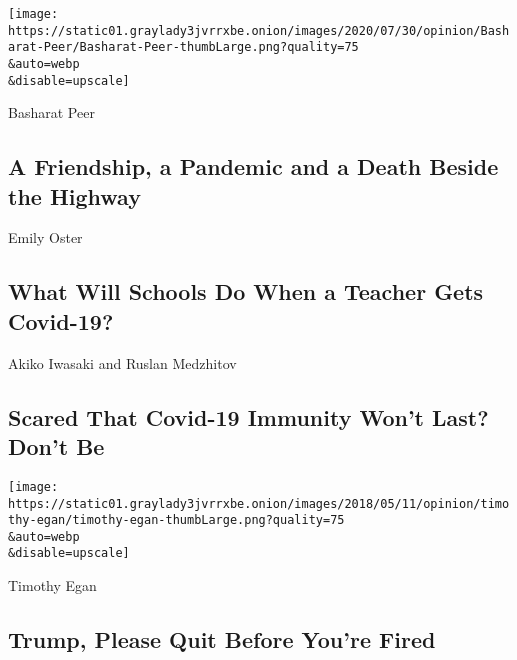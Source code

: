 \href{/2020/07/31/opinion/sunday/India-migration-coronavirus.html}{}

\texttt{[image: https://static01.graylady3jvrrxbe.onion/images/2020/07/30/opinion/Basharat-Peer/Basharat-Peer-thumbLarge.png?quality=75\\\&auto=webp\\\&disable=upscale]}

Basharat Peer

\hypertarget{a-friendship-a-pandemic-and-a-death-beside-the-highway}{%
\subsection{A Friendship, a Pandemic and a Death Beside the
Highway}\label{a-friendship-a-pandemic-and-a-death-beside-the-highway}}

\href{/2020/07/28/opinion/coronavirus-schools-reopening.html}{}

Emily Oster

\hypertarget{what-will-schools-do-when-a-teacher-gets-covid-19}{%
\subsection{What Will Schools Do When a Teacher Gets
Covid-19?}\label{what-will-schools-do-when-a-teacher-gets-covid-19}}

\href{/2020/07/31/opinion/coronavirus-antibodies-immunity.html}{}

Akiko Iwasaki and Ruslan Medzhitov

\hypertarget{scared-that-covid-19-immunity-wont-last-dont-be}{%
\subsection{Scared That Covid-19 Immunity Won't Last? Don't
Be}\label{scared-that-covid-19-immunity-wont-last-dont-be}}

\href{/2020/07/31/opinion/trump-resign.html}{}

\texttt{[image: https://static01.graylady3jvrrxbe.onion/images/2018/05/11/opinion/timothy-egan/timothy-egan-thumbLarge.png?quality=75\\\&auto=webp\\\&disable=upscale]}

Timothy Egan

\hypertarget{trump-please-quit-before-youre-fired}{%
\subsection{Trump, Please Quit Before You're
Fired}\label{trump-please-quit-before-youre-fired}}

\href{/2020/07/31/opinion/israeli-palestinian-peace.html}{}

